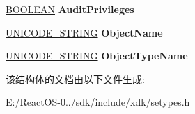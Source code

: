 \begin{DoxyCompactItemize}
\begin{tabbing}
\end{tabbing}\item 
\mbox{\label{struct___a_c_c_e_s_s___s_t_a_t_e_a8b67d9dffc2e3147e798ade5590a17e6}} 
\hyperlink{_processor_bind_8h_a112e3146cb38b6ee95e64d85842e380a}{B\+O\+O\+L\+E\+AN} {\bfseries Audit\+Privileges}
\item 
\mbox{\label{struct___a_c_c_e_s_s___s_t_a_t_e_a30d6bb4fa069f7b7f0a1c8874b4d24b7}} 
\hyperlink{struct___u_n_i_c_o_d_e___s_t_r_i_n_g}{U\+N\+I\+C\+O\+D\+E\+\_\+\+S\+T\+R\+I\+NG} {\bfseries Object\+Name}
\item 
\mbox{\label{struct___a_c_c_e_s_s___s_t_a_t_e_ae52e8b7e149527ce9721219e63731fc7}} 
\hyperlink{struct___u_n_i_c_o_d_e___s_t_r_i_n_g}{U\+N\+I\+C\+O\+D\+E\+\_\+\+S\+T\+R\+I\+NG} {\bfseries Object\+Type\+Name}
\end{DoxyCompactItemize}


该结构体的文档由以下文件生成\+:\begin{DoxyCompactItemize}
\item 
E\+:/\+React\+O\+S-\/0../sdk/include/xdk/setypes.\+h\end{DoxyCompactItemize}

